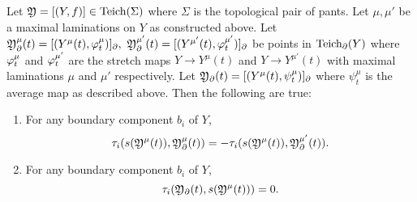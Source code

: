\begin{lemma}\label{lem:final}
  Let $ \mathfrak{Y} = [(Y,f)]\in \text{Teich}(\Sigma)$ where $\Sigma$ is the topological pair of pants. Let $\mu,\mu'$ be a maximal laminations on $Y$ as constructed above. Let $ \mathfrak{Y}_\partial^\mu(t) = [(Y^\mu(t),\varphi^\mu_t)]_\partial,\ \mathfrak{Y}_\partial^{\mu'}(t) = [(Y^{\mu'}(t),\varphi^{\mu'}_t)]_\partial$ be points in $\text{Teich}_\partial(Y)$ where $\varphi^\mu_t$ and $\varphi^{\mu'}_t$ are the stretch maps $Y\to Y^\mu(t)$ and $Y\to Y^{\mu'}(t)$ with maximal laminations $\mu$ and $\mu'$ respectively. Let $ \mathfrak{Y}_\partial(t) = [(Y^\mu(t), \psi^\mu_t)]_\partial$ where $\psi^\mu_t$ is the average map as described above. Then the following are true:
  \begin{enumerate}
    \item For any boundary component $b_i$ of $Y$, $$\tau_i(s(\mathfrak{Y}^\mu(t)), \mathfrak{Y}^\mu_\partial(t)) = - \tau_i(s(\mathfrak{Y}^\mu(t)), \mathfrak{Y}^{\mu'}_\partial(t)).$$
    \item For any boundary component $b_i$ of $Y$, $$\tau_i( \mathfrak{Y}_\partial(t), s( \mathfrak{Y}^\mu(t))) = 0.$$
  \end{enumerate}
\end{lemma}
